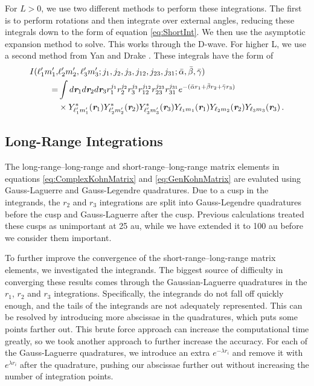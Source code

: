 \documentclass[preprint,showpacs,preprintnumbers,amsmath,amssymb]{revtex4}
\begin{document}
For $L > 0$, we use two different methods to perform these integrations. The first is to perform rotations and then integrate over external angles, reducing these integrals down to the form of equation \ref{eq:ShortInt}. We then use the asymptotic expansion method to solve. This works through the D-wave. For higher L, we use a second method from Yan and Drake \cite{Yan1997}. These integrals have the form of
\begin{align}
\label{eq:ShortIntGen}
\nonumber I(\ell_1^\prime m_1^\prime, & \ell_2^\prime m_2^\prime, \ell_3^\prime m_3^\prime; j_1,j_2,j_3,j_{12},j_{23},j_{31}; \bar{\alpha}, \bar{\beta}, \bar{\gamma}) \\
\nonumber = & \int
d \textit{\textbf{r}}_1 d \textit{\textbf{r}}_2 d \textit{\textbf{r}}_3
r_1^{j_1} r_2^{j_2} r_3^{j_3} r_{12}^{j_{12}}
r_{23}^{j_{23}} r_{31}^{j_{31}}
e^{-(\bar{\alpha} r_1 + \bar{\beta} r_2 + \bar{\gamma} r_3)} \\
& \times Y_{\ell_1^\prime m_1^\prime}^* (\textit{\textbf{r}}_1) Y_{\ell_2^\prime m_2^\prime}^* (\textit{\textbf{r}}_2) Y_{\ell_3^\prime m_3^\prime}^* (\textit{\textbf{r}}_3)
Y_{\ell_1 m_1} (\textit{\textbf{r}}_1) Y_{\ell_2 m_2} (\textit{\textbf{r}}_2) Y_{\ell_3 m_3} (\textit{\textbf{r}}_3)\, .
\end{align}

\subsection{Long-Range Integrations}
\label{sec:LongInt}
The long-range--long-range and short-range--long-range matrix elements in equations \ref{eq:ComplexKohnMatrix} and \ref{eq:GenKohnMatrix} are evaluted using Gauss-Laguerre and Gauss-Legendre quadratures. Due to a cusp in the integrands, the $r_2$ and $r_3$ integrations are split into Gauss-Legendre quadratures before the cusp and Gauss-Laguerre after the cusp.  Previous calculations \cite{VanReeth2003,VanReeth2004} treated these cusps as unimportant at 25 au, while we have extended it to 100 au before we consider them important.

To further improve the convergence of the short-range--long-range matrix elements, we investigated the integrands. The biggest source of difficulty in converging these results comes through the Gaussian-Laguerre quadratures in the $r_1$, $r_2$ and $r_3$ integrations. Specifically, the integrands do not fall off quickly enough, and the tails of the integrands are not adequately represented. This can be resolved by introducing more abscissae in the quadratures, which puts some points farther out. This brute force approach can increase the computational time greatly, so we took another approach to further increase the accuracy. For each of the Gauss-Laguerre quadratures, we introduce an extra $e^{-\lambda r_i}$ and remove it with $e^{\lambda r_i}$ after the quadrature, pushing our abscissae further out without increasing the number of integration points.
\end{document}
